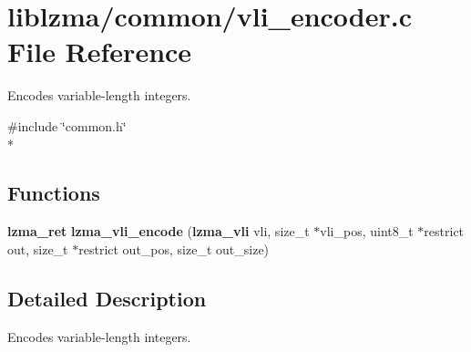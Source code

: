 \section{liblzma/common/vli\-\_\-encoder.c File Reference}
\label{vli__encoder_8c}


Encodes variable-\/length integers.  


{\ttfamily \#include \char`\"{}common.\-h\char`\"{}}\\*
\subsection*{Functions}
\begin{DoxyCompactItemize}
\item 
{\bf lzma\-\_\-ret} {\bfseries lzma\-\_\-vli\-\_\-encode} ({\bf lzma\-\_\-vli} vli, size\-\_\-t $\ast$vli\-\_\-pos, uint8\-\_\-t $\ast$restrict out, size\-\_\-t $\ast$restrict out\-\_\-pos, size\-\_\-t out\-\_\-size)\label{vli__encoder_8c_ab803b0f6087cf18e177952b88620d846}

\end{DoxyCompactItemize}


\subsection{Detailed Description}
Encodes variable-\/length integers. 